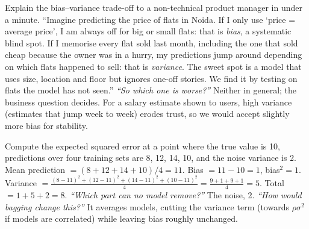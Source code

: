 \begin{qa}{Explain the bias--variance trade-off to a non-technical product manager in under a minute.}
\why
``Imagine predicting the price of flats in Noida. If I only use `price = average price', I am always off for
big or small flats: that is \emph{bias}, a systematic blind spot. If I memorise every flat sold last month,
including the one that sold cheap because the owner was in a hurry, my predictions jump around depending on
which flats happened to sell: that is \emph{variance}. The sweet spot is a model that uses size, location and
floor but ignores one-off stories. We find it by testing on flats the model has not seen.''
\pushes \emph{``So which one is worse?''} Neither in general; the business question decides. For a salary
estimate shown to users, high variance (estimates that jump week to week) erodes trust, so we would accept
slightly more bias for stability.
\end{qa}

\begin{qa}{Compute the expected squared error at a point where the true value is 10, predictions over
four training sets are 8, 12, 14, 10, and the noise variance is 2.}
\why Mean prediction $= (8+12+14+10)/4 = 11$. Bias $= 11 - 10 = 1$, bias$^2 = 1$.
Variance $= \frac{(8-11)^2 + (12-11)^2 + (14-11)^2 + (10-11)^2}{4} = \frac{9+1+9+1}{4} = 5$.
Total $= 1 + 5 + 2 = 8$.
\pushes \emph{``Which part can no model remove?''} The noise, 2. \emph{``How would bagging change this?''} It
averages models, cutting the variance term (towards $\rho\sigma^2$ if models are correlated) while leaving bias
roughly unchanged.
\end{qa}

